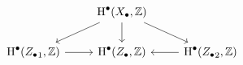 \documentclass[crop,dvisvgm]{standalone}
\begin{document}
\[\begin {tikzcd}
      & \operatorname {H}^\bullet (X_\bullet ,\mathbb {Z})
        \ar [dl] \ar [d] \ar [dr]
    \\\operatorname {H}^\bullet ({Z_\bullet }_1,\mathbb {Z})
        \ar [r]
      & \operatorname {H}^\bullet (Z_\bullet ,\mathbb {Z})
      & \operatorname {H}^\bullet ({Z_\bullet }_2,\mathbb {Z})
        \ar [l]
    \end {tikzcd}\]
\end{document}
